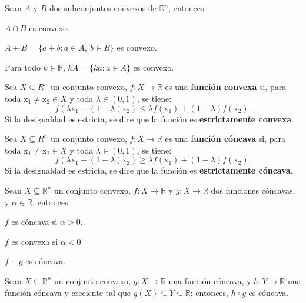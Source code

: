 \documentclass[8pt,a4paper]{extarticle}
\begin{document}
\begin{multicols}{3}
	\begin{boxprop}
		Sean $A$ y $B$ dos subconjuntos convexos de $\mathbb{R}^n$, entonces:
		\begin{eqlist}
			\item $A \cap B$ es convexo.
			\item $A + B = \{a + b : a \in A,\ b \in B\}$ es convexo.
			\item Para todo $k \in \mathbb{R}$, $kA = \{ka : a\in A\}$ es convexo.
		\end{eqlist}
	\end{boxprop}

	\begin{boxdef}
		Sea $X \subseteq R^n$ un conjunto convexo, $f : X \to \mathbb{R}$ es una \textbf{función convexa} si, para toda $\mathrm{x}_1 \neq \mathrm{x}_2 \in X$ y toda $\lambda \in (0, 1)$, se tiene:
		\[
			f(\lambda \mathrm{x}_1 + (1 - \lambda)\mathrm{x}_2) \le \lambda f(\mathrm{x}_1) + (1 - \lambda) f(\mathrm{x}_2)
			.\]
		Si la desigualdad es estricta, se dice que la función es \textbf{estrictamente convexa}.
	\end{boxdef}

	\begin{boxdef}
		Sea $X \subseteq R^n$ un conjunto convexo, $f : X \to \mathbb{R}$ es una \textbf{función cóncava} si, para toda $\mathrm{x}_1 \neq \mathrm{x}_2 \in X$ y toda $\lambda \in (0, 1)$, se tiene:
		\[
			f(\lambda \mathrm{x}_1 + (1 - \lambda)\mathrm{x}_2) \ge \lambda f(\mathrm{x}_1) + (1 - \lambda) f(\mathrm{x}_2)
			.\]
		Si la desigualdad es estricta, se dice que la función es \textbf{estrictamente cóncava}.
	\end{boxdef}

	\begin{boxprop}
		Sean $X \subseteq \mathbb{R}^n$ un conjunto convexo, $f : X \to \mathbb{R}$ y $g : X \to \mathbb{R}$ dos funciones cóncavas, y $\alpha \in \mathbb{R}$, entonces:
		\begin{eqlist}
			\item $f$ es cóncava si $\alpha > 0$.
			\item $f$ es convexa si $\alpha < 0$.
			\item $f+g$ es cóncava.
		\end{eqlist}
	\end{boxprop}

	\begin{boxprop}
		Sean $X \subseteq \mathbb{R}^n$ un conjunto convexo, $g : X \to \mathbb{R}$ una función cóncava, y $h : Y \to \mathbb{R}$ una función cóncava y creciente tal que $g(X) \subseteq Y \subseteq \mathbb{R}$; entonces, $h \circ g$ es cóncava.
	\end{boxprop}


\end{multicols}
\end{document}
